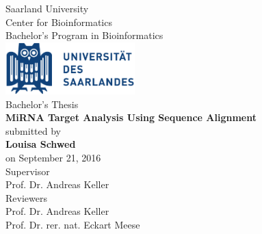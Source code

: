 \documentclass[11pt, a4paper, oneside]{book}
\begin{document}
\def\supervisorIname{Advisor I}
\def\supervisorIIname{Second Reviewer}

	\def\university{Saarland Universitiy}
	\def\institute{Center for Bioinformatics}
	\def\chair{Bachelor's Program in Bioinformatics}
	\def\projectname{MiRNA Target Analysis Using Sequence Alignment}
	\vspace{.2em}  
	\def\author{Louisa Schwed}
	\def\date{September 2016}

\begin{titlepage}

  \begin{minipage}{\textwidth}
    \begin{center}
    { \large Saarland University \\ Center for Bioinformatics\\ Bachelor's Program in Bioinformatics \\}
	\vspace{1.5cm}
    \includegraphics[width=5cm]{Logo-Universitaet_des_Saarlandes.pdf}\\
    \vspace{1.5cm}
    { \large Bachelor's Thesis\\}
    \vspace{0.5cm}
    {\huge\textbf{\projectname}}\\
    \vspace{1.5cm}
    { \large submitted by}\\
	\vspace{0.5cm}
    {\large\textbf{\author}}\\
    \vspace{0.5cm}
    {\large on September 21, 2016}\\
    \vspace{1.5cm}
    {\large Supervisor}\\
    \vspace{0.5cm}
    {\large Prof. Dr. Andreas Keller}\\
    \vspace{1.5cm}
    {\large Reviewers}\\
    \vspace{0.5cm}
    {\large Prof. Dr. Andreas Keller}\\
   	{\large Prof. Dr. rer. nat. Eckart Meese}\\
    \vspace{0.5cm}
    \end{center}
  \end{minipage}   
   

\end{titlepage}
\end{document}
